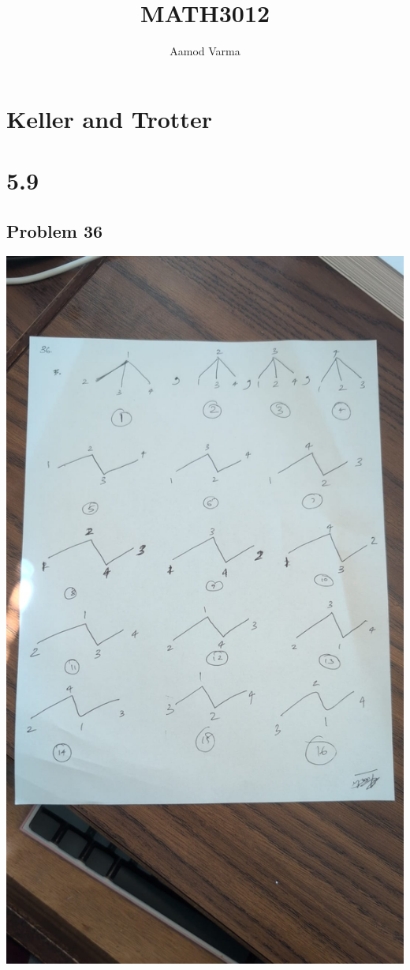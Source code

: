 \documentclass[a4paper]{report}
\title{MATH3012}
\author{Aamod Varma}
\begin{document}
\maketitle


\section*{Keller and Trotter}

\section*{5.9}

\subsection*{Problem 36}
\includegraphics[scale=.25]{36}
\end{document}
